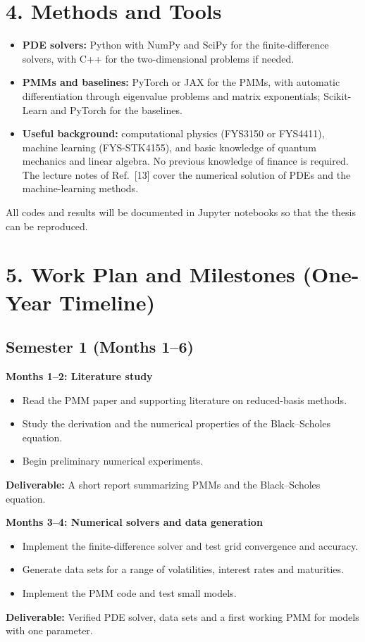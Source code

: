 \documentclass[12pt,a4paper]{article}
\begin{document}
\section*{4. Methods and Tools}

\begin{itemize}
  \item \textbf{PDE solvers:} Python with NumPy and SciPy for the
  finite-difference solvers, with C++ for the two-dimensional
  problems if needed.
  \item \textbf{PMMs and baselines:} PyTorch or JAX for the PMMs, with
  automatic differentiation through eigenvalue problems and matrix
  exponentials; Scikit-Learn and PyTorch for the baselines.
  \item \textbf{Useful background:} computational physics (FYS3150 or
  FYS4411), machine learning (FYS-STK4155), and basic knowledge of
  quantum mechanics and linear algebra.  No previous knowledge of
  finance is required.  The lecture notes of Ref.~[13] cover the
  numerical solution of PDEs and the machine-learning methods.
\end{itemize}
All codes and results will be documented in Jupyter notebooks so that
the thesis can be reproduced.

\section*{5. Work Plan and Milestones (One-Year Timeline)}

\subsection*{Semester 1 (Months 1--6)}

\textbf{Months 1--2: Literature study}
\begin{itemize}
    \item Read the PMM paper and supporting literature on
    reduced-basis methods.
    \item Study the derivation and the numerical properties of the
    Black--Scholes equation.
    \item Begin preliminary numerical experiments.
\end{itemize}
\textbf{Deliverable:} A short report summarizing PMMs and the
Black--Scholes equation.

\bigskip

\textbf{Months 3--4: Numerical solvers and data generation}
\begin{itemize}
    \item Implement the finite-difference solver and test grid
    convergence and accuracy.
    \item Generate data sets for a range of volatilities, interest
    rates and maturities.
    \item Implement the PMM code and test small models.
\end{itemize}
\textbf{Deliverable:} Verified PDE solver, data sets and a first
working PMM for models with one parameter.
\end{document}
